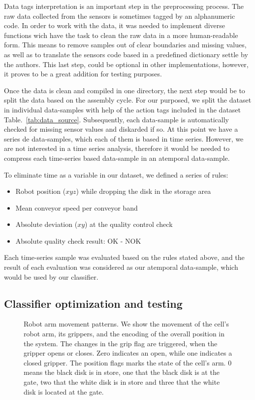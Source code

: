 \documentclass[5p,times,procedia]{elsarticle}
\begin{document}
Data tags interpretation is an important step in the preprocessing process. The raw data collected from the sensors is sometimes tagged by an alphanumeric code. In order to work with the data, it was needed to implement diverse functions wich have the task to clean the raw data in a more human-readable form. This means to remove samples out of clear boundaries and missing values, as well as to translate the sensors code based in a predefined dictionary settle by the authors. This last step, could be optional in other implementations, however, it proves to be a great addition for testing purposes.

Once the data is clean and compiled in one directory, the next step would be to split the data based on the assembly cycle. For our purposed, we split the dataset in individual data-samples with help of the action tags included in the dataset Table.~\ref{tab:data_source}. Subsequently, each data-sample is automatically checked for missing sensor values and diskarded if so. At this point we have a series de data-samples, which each of them is based in time series. However, we are not interested in a time series analysis, therefore it would be needed to compress each time-series based data-sample in an atemporal data-sample.

To eliminate time as a variable in our dataset, we defined a series of rules:

\begin{itemize}
       \item Robot position ($xyz$) while dropping the disk in the storage area
       \item Mean conveyor speed per conveyor band
       \item Absolute deviation ($xy$) at the quality control check
       \item Absolute quality check result: OK - NOK
\end{itemize}

Each time-series sample was evaluated based on the rules stated above, and the result of each evaluation was considered as our atemporal data-sample, which would be used by our classifier.

\subsection{Classifier optimization and testing}\label{sec:ml_exp}

\begin{figure}
       
       \caption{Robot arm movement patterns. We show the movement of the 
                cell's robot arm, its grippers, and the encoding of the overall
                position in the system. The changes in the grip flag are triggered,
                when the gripper opens or closes. Zero indicates an open, while
                one indicates a closed gripper. The position flags marks the state
                of the cell's arm. 0 means the black disk is in store,
                one that the black disk is at the gate, two that the white disk
                is in store and three that the white disk is located at the gate.
             }
\label{fig:robot_pos_cell}
\end{figure}
\end{document}
